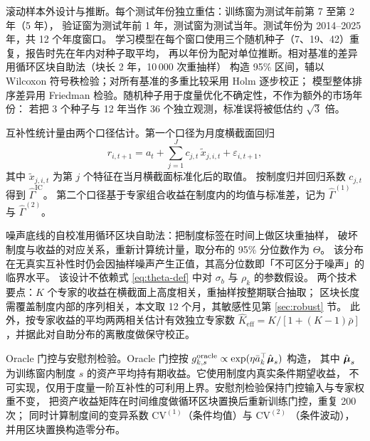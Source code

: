 滚动样本外设计与推断。每个测试年份独立重估：训练窗为测试年前第 7 至第 2 年（5 年），
验证窗为测试年前 1 年，测试窗为测试当年。测试年份为 2014--2025 年，共 12 个年度窗口。
学习模型在每个窗口使用三个随机种子（7、19、42）重复，报告时先在年内对种子取平均，
再以年份为配对单位推断。相对基准的差异用循环区块自助法（块长 2 年，10\,000 次重抽样）
构造 95\% 区间，辅以 Wilcoxon 符号秩检验；对所有基准的多重比较采用 Holm 逐步校正；
模型整体排序差异用 Friedman 检验。随机种子用于度量优化不确定性，不作为额外的市场年份：
若把 3 个种子与 12 年当作 36 个独立观测，标准误将被低估约 $\sqrt{3}$ 倍。

互补性统计量由两个口径估计。第一个口径为月度横截面回归
\begin{equation}
r_{i,t+1}=a_t+\sum_{j=1}^J c_{j,t}\,\tilde x_{j,i,t}+\varepsilon_{i,t+1},
\label{eq:cs-regression}
\end{equation}
其中 $\tilde x_{j,i,t}$ 为第 $j$ 个特征在当月横截面标准化后的取值。
按制度归并回归系数 $c_{j,t}$ 得到 $\hat\Gamma^{\text{IC}}$。
第二个口径基于专家组合收益在制度内的均值与标准差，记为 $\hat\Gamma^{(1)}$
与 $\hat\Gamma^{(2)}$。

噪声底线的自校准用循环区块自助法：把制度标签在时间上做区块重抽样，
破坏制度与收益的对应关系，重新计算统计量，取分布的 95\% 分位数作为 $\Theta$。
该分布在无真实互补性时仍会因抽样噪声产生正值，其高分位数即「不可区分于噪声」的临界水平。
该设计不依赖式 \eqref{eq:theta-def} 中对 $\sigma_b$ 与 $\rho_k$ 的参数假设。
两个技术要点：$K$ 个专家的收益在横截面上高度相关，重抽样按整期联合抽取；
区块长度需覆盖制度内部的序列相关，本文取 12 个月，其敏感性见第 \ref{sec:robust} 节。
此外，按专家收益的平均两两相关估计有效独立专家数
$\hat K_{\text{eff}}=K/[1+(K-1)\bar\rho]$，并据此对自助分布的离散度做保守校正。

Oracle 门控与安慰剂检验。Oracle 门控按
$g^{\text{oracle}}_{k,s}\propto\exp(\eta\bar a_k^\top\hat{\boldsymbol{\mu}}_s)$ 构造，
其中 $\hat{\boldsymbol{\mu}}_s$ 为训练窗内制度 $s$ 的资产平均持有期收益。它使用制度内真实条件期望收益，
不可实现，仅用于度量一阶互补性的可利用上界。安慰剂检验保持门控输入与专家权重不变，
把资产收益矩阵在时间维度做循环区块置换后重新训练门控，重复 200 次；
同时计算制度间的变异系数 $\mathrm{CV}^{(1)}$（条件均值）与 $\mathrm{CV}^{(2)}$
（条件波动），并用区块置换构造零分布。
